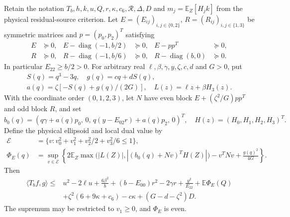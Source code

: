\begin{proposition}
\label{prop:full-even-r3}
Retain the notation $T_b,h,k,u,Q,r,\kappa,c_6,\mathcal R,\Delta,D$
and $m_j=\mathbb E_Z[H_jk]$ from the physical residual-source criterion.
Let $E=(E_{ij})_{i,j\in\{0,2\}}$, $R=(R_{ij})_{i,j\in\{1,3\}}$
be symmetric matrices and $p=(p_0,p_2)^T$ satisfying
\begin{align*}
 E&\succeq0,& E-\operatorname{diag}(-1,b/2)&\succeq0,&
 E-pp^T&\succeq0,\\
 R&\succeq0,& R-\operatorname{diag}(-1,b/6)&\succeq0,&
 R-\operatorname{diag}(b,0)&\succeq0.
\end{align*}
In particular $E_{22}\geq b/2>0$.  For arbitrary real
$\ell,\beta,\gamma,y,\zeta,c,d$ and $G>0$, put
\begin{gather*}
 S(q)=q^3-3q,\quad g(q)=cq+dS(q),\\
 a(q)=\zeta[-S(q)+g(q)/(2G)],\quad L(z)=\ell z+\beta H_3(z).
\end{gather*}
With the coordinate order $(0,1,2,3)$, let $N$ have even block
$E+(\zeta^2/G)pp^T$ and odd block $R$, and set
\[
 b_0(q)=(q\gamma+a(q)p_0,\,0,\,
           q(y-E_{02}r)+a(q)p_2,\,0)^T,
 \quad H(z)=(H_0,H_1,H_2,H_3)^T.
\]
Define the physical ellipsoid and local dual value by
\begin{align*}
 \mathcal E&=\{v:v_0^2+v_1^2+v_2^2/2+v_3^2/6\leq1\},\\
 \Phi_E(q)&=\sup_{v\in\mathcal E}\left\{
 2\mathbb E_Z\max\bigl(|L(Z)|,|(b_0(q)+Nv)^TH(Z)|\bigr)
 -v^TNv+\frac{g(q)^2}{4G}\right\}.
\end{align*}
Then
\begin{align*}
 \langle T_bf,g\rangle\leq{}&
 u^2-2\ell u+\frac{6\beta^2}{b}
 +(b-E_{00})r^2-2\gamma r+\frac{y^2}{E_{22}}
 +\mathbb E\Phi_E(Q)\\
 &+\zeta^2(6+9\kappa+c_6)-c\kappa+(G-d-\zeta^2)D.
\end{align*}
The supremum may be restricted to $v_1\geq0$, and $\Phi_E$ is even.
\end{proposition}
